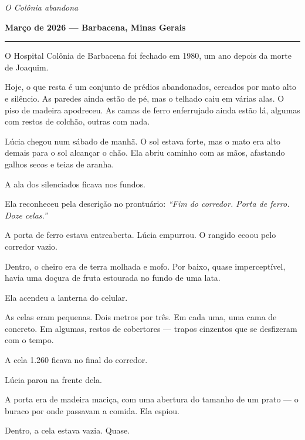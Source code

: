 
\noindent \textit{O Colônia abandona}

\noindent \textbf{Março de 2026 --- Barbacena, Minas Gerais}

\vspace{0.5em}\noindent\rule{\textwidth}{0.5pt}\vspace{0.5em}

\noindent O Hospital Colônia de Barbacena foi fechado em 1980, um ano depois da morte de Joaquim.

\noindent Hoje, o que resta é um conjunto de prédios abandonados, cercados por mato alto e silêncio. As paredes ainda estão de pé, mas o telhado caiu em várias alas. O piso de madeira apodreceu. As camas de ferro enferrujado ainda estão lá, algumas com restos de colchão, outras com nada.

\noindent Lúcia chegou num sábado de manhã. O sol estava forte, mas o mato era alto demais para o sol alcançar o chão. Ela abriu caminho com as mãos, afastando galhos secos e teias de aranha.

\noindent A ala dos silenciados ficava nos fundos.

\noindent Ela reconheceu pela descrição no prontuário: \textit{\textquotedblleft{}Fim do corredor. Porta de ferro. Doze celas.\textquotedblright{}}

\noindent A porta de ferro estava entreaberta. Lúcia empurrou. O rangido ecoou pelo corredor vazio.

\noindent Dentro, o cheiro era de terra molhada e mofo. Por baixo, quase imperceptível, havia uma doçura de fruta estourada no fundo de uma lata.

\noindent Ela acendeu a lanterna do celular.

\noindent As celas eram pequenas. Dois metros por três. Em cada uma, uma cama de concreto. Em algumas, restos de cobertores --- trapos cinzentos que se desfizeram com o tempo.

\noindent A cela 1.260 ficava no final do corredor.

\noindent Lúcia parou na frente dela.

\noindent A porta era de madeira maciça, com uma abertura do tamanho de um prato --- o buraco por onde passavam a comida. Ela espiou.

\noindent Dentro, a cela estava vazia.
Quase.

